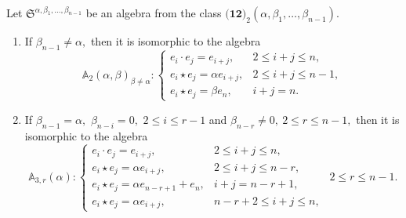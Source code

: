 \documentclass{jonasart}
\begin{document}
	\begin{lemma}\label{12-lem-alpha_2}
		Let $\mathfrak{S}^{\alpha, \beta_{1},\dots, \beta_{n-1}}$ be an algebra from the class $\textbf{(12)}_2 (\alpha, \beta_{1},\dots,\beta_{n-1})$.
		\begin{enumerate}
			\item If $\beta_{n-1} \neq \alpha,$ then it is isomorphic to the algebra
			\[
				\mathbb{A}_2 (\alpha,\beta)_{\beta \neq \alpha}:\left\{
				\begin{array}{ll}
					e_i\cdot e_j =e_{i+j}, & 2\leq i+j \leq n, \\[1mm]
					e_i\star e_j =\alpha e_{i+j}, & 2\leq i+j \leq n-1, \\[1mm]
					e_i \star e_j =\beta e_{n}, & i+j = n.
				\end{array}
				\right.
			\]
			\item If $\beta_{n-1} = \alpha, $ $\beta_{n-i}=0,$ $2\leq i\leq r-1$ and $\beta_{n-r} \neq 0, \ 2 \le r \le {n-1},$ then it is isomorphic to the algebra
			\[
				\mathbb{A}_{3,r}(\alpha):\left\{
				\begin{array}{ll}
					e_i\cdot e_j =e_{i+j}, & 2\leq i+j \leq n, \\[1mm]
					e_i\star e_j =\alpha e_{i+j}, & 2\leq i+j \leq n-r, \\[1mm]
					e_i\star e_j =\alpha e_{n-r+1}+e_n, & i+j =n-r+1, \\[1mm]
					e_i\star e_j =\alpha e_{i+j}, & n-r+2 \leq i+j \leq n,
				\end{array}
				\right. \ \ 2\leq r\leq n-1.
			\]
		\end{enumerate}
	\end{lemma}
\end{document}
